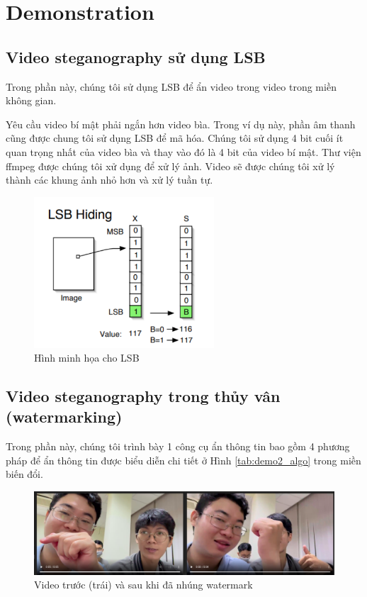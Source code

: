 \chapter{Demonstration}

\section{Video steganography sử dụng LSB}

Trong phần này, chúng tôi sử dụng LSB để ẩn video trong video trong miền không gian.

Yêu cầu video bí mật phải ngắn hơn video bìa. Trong ví dụ này, phần âm thanh cũng được chung tôi sử dụng LSB để mã hóa. Chúng tôi sử dụng 4 bit cuối ít quan trọng nhất của video bìa và thay vào đó là 4 bit của video bí mật. Thư viện ffmpeg được chúng tôi xử dụng để xử lý ảnh. Video sẽ được chúng tôi xử lý thành các khung ảnh nhỏ hơn và xử lý tuần tự.

\begin{figure}[!h]
    \centering
    \includegraphics[width=0.6\textwidth]{graphics/chapter-3/lsb_hiding.PNG}
    \caption{Hình minh họa cho LSB}
    \label{fig:LSB}
\end{figure}

\section{Video steganography trong thủy vân (watermarking)}

Trong phần này, chúng tôi trình bày 1 công cụ ẩn thông tin bao gồm 4 phương pháp để ẩn thông tin được biểu diễn chi tiết ở Hình \ref{tab:demo2_algo} trong miền biến đổi. 

\begin{figure}
    \centering
    \includegraphics[scale=0.4]{graphics/chapter-3/chap3-video-hiding-video.png}
    \caption{Video trước (trái) và sau khi đã nhúng watermark}
    \label{fig:chap3-video-hiding-video}
\end{figure}


